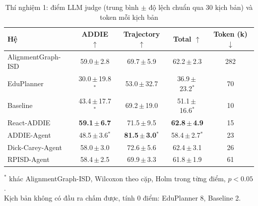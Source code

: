 \begin{table}[t]
  \caption{Thí nghiệm 1: điểm LLM judge (trung bình $\pm$ độ lệch chuẩn qua 30 kịch bản) và token mỗi kịch bản}
  \label{tab:judge}
  \centering
  \footnotesize
  \setlength{\tabcolsep}{2.5pt}
  \begin{tabular}{@{}lcccc@{}}
    \toprule
    Hệ & ADDIE $\uparrow$ & Trajectory $\uparrow$ & Total $\uparrow$ & Token (k) $\downarrow$ \\
    \midrule
    AlignmentGraph-ISD & 59.0\,$\pm$\,2.8 & 69.7\,$\pm$\,5.9 & 62.2\,$\pm$\,2.3 & 282 \\
    EduPlanner & 30.0\,$\pm$\,19.8$^{*}$ & 53.0\,$\pm$\,32.7 & 36.9\,$\pm$\,23.2$^{*}$ & 70 \\
    Baseline & 43.4\,$\pm$\,17.7$^{*}$ & 69.2\,$\pm$\,19.0 & 51.1\,$\pm$\,16.6$^{*}$ & 10 \\
    React-ADDIE & \textbf{59.1\,$\pm$\,6.7} & 71.5\,$\pm$\,9.5 & \textbf{62.8\,$\pm$\,4.9} & 15 \\
    ADDIE-Agent & 48.5\,$\pm$\,3.6$^{*}$ & \textbf{81.5\,$\pm$\,3.0$^{*}$} & 58.4\,$\pm$\,2.7$^{*}$ & 23 \\
    Dick-Carey-Agent & 58.0\,$\pm$\,3.0 & 72.6\,$\pm$\,5.6 & 62.4\,$\pm$\,3.1 & 26 \\
    RPISD-Agent & 58.4\,$\pm$\,2.5 & 69.9\,$\pm$\,3.3 & 61.8\,$\pm$\,1.9 & 61 \\
    \bottomrule
  \end{tabular}
  \par\vspace{2pt}
  {\scriptsize\raggedright $^{*}$ khác AlignmentGraph-ISD, Wilcoxon theo cặp, Holm trong từng điểm, $p<0.05$.\\ Kịch bản không có đầu ra chấm được, tính 0 điểm: EduPlanner 8, Baseline 2.\par}
\end{table}
